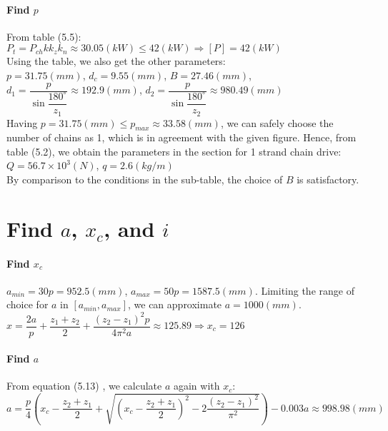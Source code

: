 \paragraph{Find $ p $}
From table (5.5):\\
$ P_t = P_{ch}kk_zk_n \approx 30.05 \unit{(kW)} \leq 42 \unit{(kW)} \Rightarrow [P] = 42 \unit{(kW)}$\\
Using the table, we also get the other parameters:\\
$ p = 31.75 \unit{(mm)}$, $ d_c = 9.55 \unit{(mm)} $, $ B = 27.46 \unit{(mm)} $,\\
$ d_1=\dfrac{p}{\sin{\dfrac{180^\circ}{z_1}}} \approx 192.9 \unit{(mm)} $, 
$ d_2=\dfrac{p}{\sin{\dfrac{180^\circ}{z_2}}} \approx  980.49 \unit{(mm)}$\\
Having $ p = 31.75 \unit{(mm) \leq p_{max}} \approx 33.58 \unit{(mm)} $, we can safely choose the number of chains as 1, which is in agreement with the given figure. Hence, from table (5.2), we obtain the parameters in the section for 1 strand chain drive:\\
$ Q = 56.7\times10^3\unit{(N)} $, $ q = 2.6\unit{(kg/m)} $\\
By comparison to the conditions in the sub-table, the choice of $ B $ is satisfactory.

\section{Find $ a $, $ x_c $, and $ i $}

\paragraph{Find $ x_c $}
$ a_{min} = 30p = 952.5 \unit{(mm)} $, $ a_{max} = 50p = 1587.5 \unit{(mm)}$. Limiting the range of choice for $ a $ in $ [a_{min},a_{max}] $, we can approximate $ a= 1000 \unit{(mm)} $.\\
$ x = \dfrac{2a}{p} + \dfrac{z_1+z_2}{2} + \dfrac{(z_2-z_1)^2p}{4\pi^2a} \approx 125.89 \Rightarrow x_c = 126 $

\paragraph{Find $ a $}
From equation (5.13) , we calculate $ a $ again with $ x_c $:\\
$ a = \dfrac{p}{4}\left(x_c-\dfrac{z_2+z_1}{2}+\sqrt{\left(x_c-\dfrac{z_2+z_1}{2}\right)^2-2\dfrac{(z_2-z_1)^2}{\pi^2}}\right) - 0.003a\approx 998.98 \unit{(mm)}$

